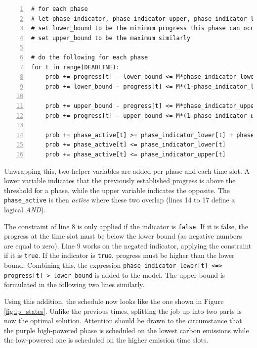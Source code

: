 \begin{minipage}{\linewidth}
\begin{lstlisting}[frame=single, numbers=left, caption={Phase detection in LP}, label={list:lp_phases}, basicstyle=\ttfamily, breaklines]
# for each phase
# let phase_indicator, phase_indicator_upper, phase_indicator_lower be DEADLINE-many boolean variables
# set lower_bound to be the minimum progress this phase can occur in 
# set upper_bound to be the maximum similarly

# do the following for each phase
for t in range(DEADLINE):
    prob += progress[t] - lower_bound <= M*phase_indicator_lower[t]
    prob += lower_bound - progress[t] <= M*(1-phase_indicator_lower[t])

    prob += upper_bound - progress[t] <= M*phase_indicator_upper[t]
    prob += progress[t] - upper_bound <= M*(1-phase_indicator_upper[t])

    prob += phase_active[t] >= phase_indicator_lower[t] + phase_indicator_upper[t] - 1
    prob += phase_active[t] <= phase_indicator_lower[t]
    prob += phase_active[t] <= phase_indicator_upper[t]
\end{lstlisting}
\end{minipage}

Unwrapping this, two helper variables are added per phase and each time slot. 
A lower variable indicates that the previously established progress is above the threshold for a phase, while the upper variable indicates the opposite. 
The \verb|phase_active| is then \emph{active} where these two overlap (lines 14 to 17 define a logical \emph{AND}).

The constraint of line 8 is only applied if the indicator is \verb|false|.
If it is false, the progress at the time slot must be below the lower bound (as negative numbers are equal to zero).
Line 9 works on the negated indicator, applying the constraint if it is \verb|true|. 
If the indicator is \verb|true|, progress must be higher than the lower bound. 
Combining this, the expression \verb|phase_indicator_lower[t] <=> progress[t] > lower_bound| is added to the model. 
The upper bound is formulated in the following two lines similarly.

Using this addition, the schedule now looks like the one shown in Figure \ref{fig:lp_states}. 
Unlike the previous times, splitting the job up into two parts is now the optimal solution. 
Attention should be drawn to the circumstance that the purple high-powered phase is scheduled on the lowest carbon emissions while the low-powered one is scheduled on the higher emission time slots.

